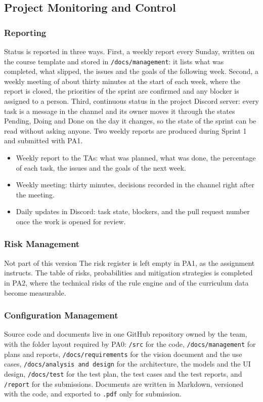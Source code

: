 \documentclass{article}
\begin{document}
\subsection{Project Monitoring and Control}
\subsubsection{Reporting}
Status is reported in three ways. First, a weekly report every Sunday, written on the course template and stored in
\texttt{/docs/management}: it lists what was completed, what slipped, the issues and the goals of the following week.
Second, a weekly meeting of about thirty minutes at the start of each week, where the report is closed, the priorities of
the sprint are confirmed and any blocker is assigned to a person. Third, continuous status in the project Discord server:
every task is a message in the channel and its owner moves it through the states Pending, Doing and Done on the day it
changes, so the state of the sprint can be read without asking anyone. Two weekly reports are produced during Sprint 1
and submitted with PA1.

\begin{itemize}
  \item Weekly report to the TAs: what was planned, what was done, the percentage of each task, the issues and the goals of
        the next week.
  \item Weekly meeting: thirty minutes, decisions recorded in the channel right after the meeting.
  \item Daily updates in Discord: task state, blockers, and the pull request number once the work is opened for review.
\end{itemize}

\subsubsection{Risk Management}
\begin{ocplain}{Not part of this version}
The risk register is left empty in PA1, as the assignment instructs. The table of risks, probabilities and mitigation
strategies is completed in PA2, where the technical risks of the rule engine and of the curriculum data become measurable.
\end{ocplain}

\subsubsection{Configuration Management}
Source code and documents live in one GitHub repository owned by the team, with the folder layout required by PA0:
\texttt{/src} for the code, \texttt{/docs/management} for plans and reports, \texttt{/docs/requirements} for the vision
document and the use cases, \texttt{/docs/analysis and design} for the architecture, the models and the UI design,
\texttt{/docs/test} for the test plan, the test cases and the test reports, and \texttt{/report} for the submissions.
Documents are written in Markdown, versioned with the code, and exported to \texttt{.pdf} only for submission.
\end{document}
